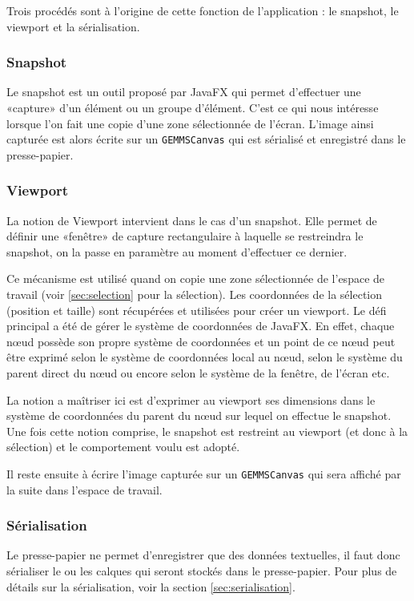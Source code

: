 Trois procédés sont à l'origine de cette fonction de l'application : le snapshot, le viewport et la sérialisation.


\subsubsection{Snapshot}
Le snapshot est un outil proposé par JavaFX qui permet d'effectuer une «capture» d'un élément ou un groupe d'élément. C'est ce qui nous intéresse lorsque l'on fait une copie d'une zone sélectionnée de l'écran. L'image ainsi capturée est alors écrite sur un \texttt{GEMMSCanvas} qui est sérialisé et enregistré dans le presse-papier.

\subsubsection{Viewport}
La notion de Viewport intervient dans le cas d'un snapshot. Elle permet de définir une «fenêtre» de capture rectangulaire à laquelle se restreindra le snapshot, on la passe en paramètre au moment d'effectuer ce dernier.

Ce mécanisme est utilisé quand on copie une zone sélectionnée de l'espace de travail (voir \ref{sec:selection} pour la sélection). Les coordonnées de la sélection (position et taille) sont récupérées et utilisées pour créer un viewport. Le défi principal a été de gérer le système de coordonnées de JavaFX. En effet, chaque n\oe ud possède son propre système de coordonnées et un point de ce n\oe ud peut être exprimé selon le système de coordonnées local au n\oe ud, selon le système du parent direct du n\oe ud ou encore selon le système de la fenêtre, de l'écran etc.

La notion a maîtriser ici est d'exprimer au viewport ses dimensions dans le système de coordonnées du parent du n\oe ud sur lequel on effectue le snapshot. Une fois cette notion comprise, le snapshot est restreint au viewport (et donc à la sélection) et le comportement voulu est adopté.

Il reste ensuite à écrire l'image capturée sur un \texttt{GEMMSCanvas} qui sera affiché par la suite dans l'espace de travail.

\subsubsection{Sérialisation}
Le presse-papier ne permet d'enregistrer que des données textuelles, il faut donc sérialiser le ou les calques qui seront stockés dans le presse-papier. Pour plus de détails sur la sérialisation, voir la section \ref{sec:serialisation}.

